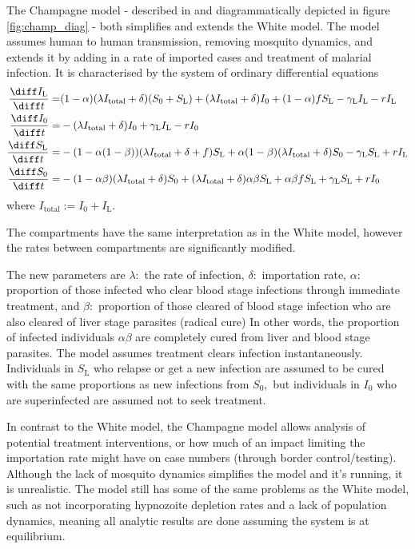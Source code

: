 The Champagne model - described in \parencite{champagne_using_2022} and diagrammatically depicted in figure \ref{fig:champ_diag} - both simplifies and extends the White model. The model assumes human to human transmission, removing mosquito dynamics, and extends it by adding in a rate of imported cases and treatment of malarial infection. It is characterised by the system of ordinary differential equations
\begin{align*}
    \frac{\diff I_\mathrm{L}}{\diff t} = & (1 - \alpha)(\lambda I_\mathrm{total} + \delta)(S_0 + S_\mathrm{L}) + (\lambda I_\mathrm{total} + \delta)I_0 + (1 - \alpha)fS_\mathrm{L} - \gamma_\mathrm{L}I_\mathrm{L} - rI_\mathrm{L}  \\
    \frac{\diff I_0}{\diff t} =          & -(\lambda I_\mathrm{total} + \delta)I_0 + \gamma_\mathrm{L}I_\mathrm{L} - rI_0                                                                                                            \\
    \frac{\diff S_\mathrm{L}}{\diff t} = & -(1 - \alpha(1 - \beta))(\lambda I_\mathrm{total} + \delta + f)S_\mathrm{L} + \alpha(1-\beta)(\lambda I_\mathrm{total} + \delta)S_0 - \gamma_\mathrm{L}S_\mathrm{L} + rI_\mathrm{L}       \\
    \frac{\diff S_0}{\diff t} =          & -(1 - \alpha\beta)(\lambda I_\mathrm{total} + \delta)S_0 + (\lambda I_\mathrm{total} + \delta)\alpha\beta S_\mathrm{L} + \alpha\beta fS_\mathrm{L} + \gamma_\mathrm{L}S_\mathrm{L} + rI_0
\end{align*} where $I_\mathrm{total} := I_0 + I_\mathrm{L}.$

The compartments have the same interpretation as in the White model, however the rates between compartments are significantly modified.

The new parameters are $\lambda:$ the rate of infection, 
$\delta:$ importation rate, 
$\alpha:$ proportion of those infected who clear blood stage
infections through immediate treatment, and 
$\beta:$ proportion of those cleared of blood stage infection who
are also cleared of liver stage parasites (radical cure)
In other words, the proportion of infected individuals $\alpha\beta$ are 
completely cured from liver and blood stage parasites. The model assumes 
treatment clears infection instantaneously. Individuals in $S_\mathrm{L}$ who 
relapse or get a new infection are assumed to be cured with the same 
proportions as new infections from $S_0,$ but individuals in $I_0$ who are 
superinfected are assumed not to seek treatment.

In contrast to the White model, the Champagne model allows analysis of potential treatment interventions, or how much of an impact limiting the importation rate might have on case numbers (through border control/testing). Although the lack of mosquito dynamics simplifies the model and it's running, it is unrealistic. The model still has some of the same problems as the White model, such as not incorporating hypnozoite depletion rates and a lack of population dynamics, meaning all analytic results are done assuming the system is at equilibrium.